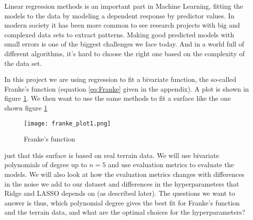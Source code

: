 \documentclass[a4paper]{article}
\begin{document}





Linear regression methods is an important part in Machine Learning, fitting the models to the data by modeling a dependent response by predictor values. In modern society it has been more common to see research projects with big and complexed data sets to extract patterns. Making good predicted models with small errors is one of the biggest challenges we face today. And in a world full of different algorithms, it's hard to choose the right one based on the complexity of the data set.


In this project we are using regression to fit a bivariate function, the so-called Franke's function (equation \ref{eq:Franke} given in the appendix). A plot  is shown in figure \ref{fig:FrankePlot}.
We then want to use the same methods to fit a surface like the one shown figure \ref{fig:FrankePlot}

\begin{figure}[h]
  \texttt{[image: franke\_plot1.png]}
  \caption{Franke's function}
  \label{fig:FrankePlot}
\end{figure}

just that this surface is based on real terrain data.  We will use bivariate polynomials of degree up to $n = 5$ and use evaluation metrics to evaluate the models. We will also look at how the evaluation metrics changes with differences in the noise we add to our dataset and differences in the hyperparameters that Ridge and LASSO depends on (as described later).
The questions we want to answer is thus, which polynomial degree gives the best fit for Franke's function and the terrain data, and what are the optimal choices for the hyperparameters? \\
\end{document}
